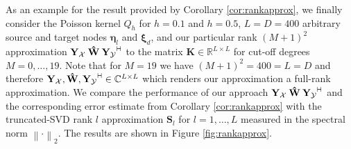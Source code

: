 \documentclass[11pt,a4paper,twoside,bibtotoc]{scrartcl}
\theoremstyle{plain}
\theoremstyle{definition}
\theoremstyle{remark}
\newcommand{\R}{\ensuremath{\mathbb{R}}}
\newcommand{\C}{\ensuremath{\mathbb{C}}}
\newcommand{\adj}{{\vdash \hspace*{-1.72mm} \dashv}}
\numberwithin{equation}{section}
\numberwithin{table}{section}
\numberwithin{figure}{section}
\begin{document}
As an example for the result provided by Corollary \ref{cor:rankapprox}, we 
finally consider the Poisson kernel $Q_{h}$ for 
$h = 0.1$ and $h=0.5$, $L=D=400$ arbitrary source and target nodes $\mathbf{\eta}_{l}$ and $\mathbf{\xi}_{d}$,
and our particular rank $(M+1)^2$ approximation 
$\mathbf{Y_{\mathcal{X}}} \: \mathbf{\hat W} \: \mathbf{Y_{\mathcal{Y}}}^{\adj}$ to the matrix $\mathbf{K} \in \R^{L \times L}$ 
for cut-off degrees $M=0,\ldots,19$. Note that for $M=19$ we 
have $(M+1)^2 = 400 = L = D$ and therefore $\mathbf{Y_{\mathcal{X}}}, \mathbf{\hat W}, 
\mathbf{Y_{\mathcal{Y}}}^{\adj} \in \C^{L \times L}$ which renders our approximation a full-rank 
approximation. We compare the performance of our approach $\mathbf{Y_{\mathcal{X}}} \: \mathbf{\hat W} \: 
\mathbf{Y_{\mathcal{Y}}}^{\adj}$ and the corresponding error estimate from Corollary \ref{cor:rankapprox}
with the truncated-SVD rank $l$ approximation $\mathbf{S}_{l}$ for $l = 1,\ldots,L$
measured in the spectral norm $\left\|\cdot\right\|_{2}$. The results are shown in Figure \ref{fig:rankapprox}. 
\end{document}
